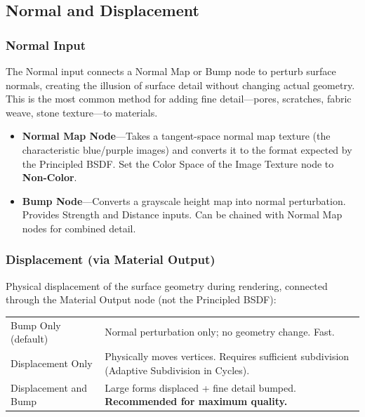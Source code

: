 \subsection{Normal and Displacement}
\label{sec:shading:principled:normal}

\subsubsection{Normal Input}

The Normal input connects a Normal Map or Bump node to perturb
surface normals, creating the illusion of surface detail without
changing actual geometry. This is the most common method for adding
fine detail---pores, scratches, fabric weave, stone texture---to
materials.

\begin{itemize}[leftmargin=2em]
  \item \textbf{Normal Map Node}---Takes a tangent-space normal map
        texture (the characteristic blue/purple images) and converts it to
        the format expected by the Principled BSDF. Set the Color
        Space of the Image Texture node to \textbf{Non-Color}.
  \item \textbf{Bump Node}---Converts a grayscale height map into
        normal perturbation. Provides Strength and Distance inputs.
        Can be chained with Normal Map nodes for combined detail.
\end{itemize}

\subsubsection{Displacement (via Material Output)}

Physical displacement of the surface geometry during rendering,
connected through the Material Output node (not the Principled
BSDF):

\begin{center}
\begin{tabularx}{\textwidth}{L{4cm}X}
\toprule
{}
 &  \\
\midrule
Bump Only (default) & Normal perturbation only; no geometry change. Fast. \\
Displacement Only & Physically moves vertices. Requires sufficient subdivision (Adaptive Subdivision in Cycles). \\
Displacement and Bump & Large forms displaced + fine detail bumped. \textbf{Recommended for maximum quality.} \\
\bottomrule
\end{tabularx}
\end{center}

